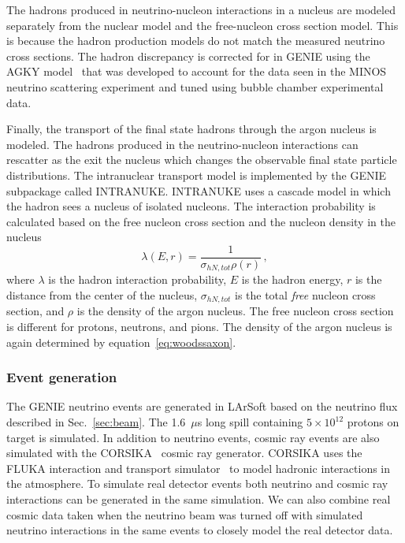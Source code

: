     The hadrons produced in neutrino-nucleon interactions in a nucleus are
    modeled separately from the nuclear model and the free-nucleon cross
    section model. This is because the hadron production models do not match
    the measured neutrino cross sections.  The hadron discrepancy is corrected
    for in GENIE using the AGKY model~\cite{Yang:2009zx} that was developed to
    account for the data seen in the MINOS~\cite{Adamson:2007gu} neutrino
    scattering experiment and tuned using bubble chamber experimental data.

    Finally, the transport of the final state hadrons through the argon nucleus
    is modeled. The hadrons produced in the neutrino-nucleon interactions can
    rescatter as the exit the nucleus which changes the observable final state
    particle distributions. The intranuclear transport model is implemented by
    the GENIE subpackage called INTRANUKE. INTRANUKE uses a cascade model in
    which the hadron sees a nucleus of isolated nucleons. The interaction
    probability is calculated based on the free nucleon cross section and the
    nucleon density in the nucleus~\cite{Andreopoulos:2015wxa}
    \begin{equation}
      \lambda(E,r) = \frac{1}{\sigma_{hN,tot} \rho(r)} \,,
    \end{equation}
    where $\lambda$ is the hadron interaction probability, $E$ is the hadron
    energy, $r$ is the distance from the center of the nucleus,
    $\sigma_{hN,tot}$ is the total \textit{free} nucleon cross section, and
    $\rho$ is the density of the argon nucleus. The free nucleon cross section
    is different for protons, neutrons, and pions. The density of the argon
    nucleus is again determined by equation~\ref{eq:woodssaxon}.

  \subsubsection{Event generation}\label{sec:eventgen}
    The GENIE neutrino events are generated in LArSoft based on the neutrino
    flux described in Sec.~\ref{sec:beam}. The 1.6~$\mu$s long spill containing
    $5\times 10^{12}$ protons on target is simulated.  In addition to neutrino
    events, cosmic ray events are also simulated with the
    CORSIKA~\cite{Heck:1998vt} cosmic ray generator. CORSIKA uses the FLUKA
    interaction and transport simulator~\cite{Battistoni:1997tq} to model
    hadronic interactions in the atmosphere.  To simulate real detector events
    both neutrino and cosmic ray interactions can be generated in the same
    simulation. We can also combine real cosmic data taken when the neutrino
    beam was turned off with simulated neutrino interactions in the same events
    to closely model the real detector data.

